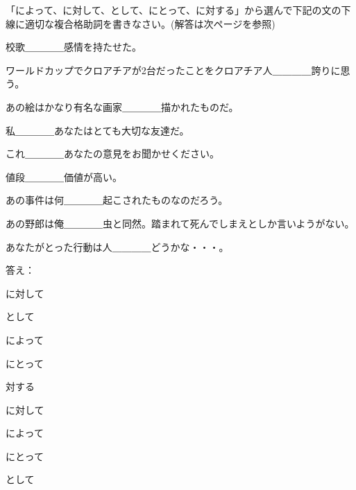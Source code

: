 
\author{Marko Miličić,Željka Ludošan}



		
	\begin{mondai}{「によって、に対して、として、にとって、に対する」から選んで下記の文の下線に適切な複合格助詞を書きなさい。(解答は次ページを参照)}
		\item 校歌＿＿＿＿感情を持たせた。
		\item ワールドカップでクロアチアが2台だったことをクロアチア人＿＿＿＿誇りに思う。
		\item あの絵はかなり有名な画家＿＿＿＿描かれたものだ。
		\item 私＿＿＿＿あなたはとても大切な友達だ。
		\item これ＿＿＿＿あなたの意見をお聞かせください。
		\item 値段＿＿＿＿価値が高い。
		\item あの事件は何＿＿＿＿起こされたものなのだろう。
		\item あの野郎は俺＿＿＿＿虫と同然。踏まれて死んでしまえとしか言いようがない。
		\item あなたがとった行動は人＿＿＿＿どうかな・・・。
	\end{mondai}
	
	\newpage
	\begin{mondai}{答え：}
		\item に対して
		\item として
		\item によって
		\item にとって
		\item 対する
		\item に対して
		\item によって
		\item にとって
		\item として
		

	\end{mondai}
	

